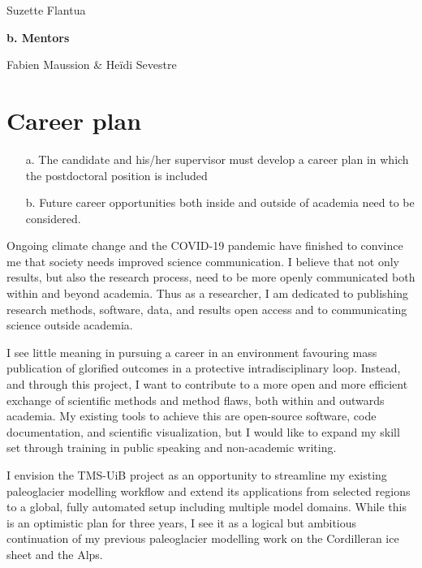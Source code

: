 \documentclass{article}
\newcommand{\guideline}[1]{{\color{color2}\itshape{#1}}}
\begin{document}
    Suzette Flantua

    \textbf{b. Mentors}

    Fabien Maussion \& Heïdi Sevestre


\section{Career plan}

    \guideline{
        \begin{itemize}
          \item[a.] The candidate and his/her supervisor must develop a career
            plan in which the postdoctoral position is included
          \item[b.] Future career opportunities both inside and outside of
            academia need to be considered.
        \end{itemize}}

    Ongoing climate change and the COVID-19 pandemic have finished to convince
    me that society needs improved science communication. I believe that not
    only results, but also the research process, need to be more openly
    communicated both within and beyond academia. Thus as a researcher, I am
    dedicated to publishing research methods, software, data, and
    results open access and to communicating science outside academia.

    I see little meaning in pursuing a career in an environment favouring mass
    publication of glorified outcomes in a protective intradisciplinary loop.
    Instead, and through this project, I want to contribute to a more open and
    more efficient exchange of scientific methods and method flaws,
    both within and outwards academia. My existing
    tools to achieve this are open-source software, code documentation, and
    scientific visualization, but I would like to expand my skill set through
    training in public speaking and non-academic writing.

    I envision the TMS-UiB project as an opportunity to
    streamline my existing paleoglacier modelling workflow and extend its
    applications from selected regions to a global, fully automated setup including
    multiple model domains. While this is an optimistic plan for three years, I
    see it as a logical but ambitious continuation of my previous paleoglacier
    modelling work on the Cordilleran ice sheet and the Alps.
\end{document}
